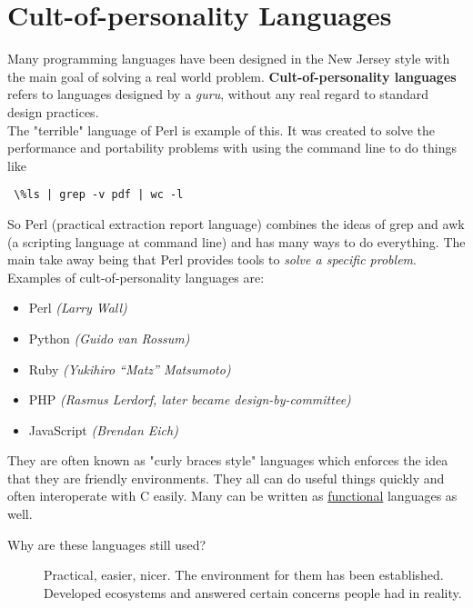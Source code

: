 \documentclass[twoside]{article}
\begin{document}
\section{Cult-of-personality Languages}
Many programming languages have been designed in the New Jersey style with the main goal of solving a real world problem. \textbf{Cult-of-personality languages}  refers to languages designed by a \emph{guru}, without any real regard to standard design practices.\\
 
\pagebreak
The "terrible" language of Perl is example of this. It was created to solve the performance and portability problems with using the command line to do things like \begin{verbatim} \%ls | grep -v pdf | wc -l \end{verbatim} So Perl (practical extraction report language) combines the ideas of grep and awk (a scripting language at command line) and has many ways to do everything. The main take away being that Perl provides tools to \emph{solve a specific problem}. Examples of cult-of-personality languages are:
\begin{itemize}
\item Perl \emph{(Larry Wall)}
\item Python \emph{(Guido van Rossum)}
\item Ruby \emph{(Yukihiro ``Matz'' Matsumoto)}
\item PHP \emph{(Rasmus Lerdorf, later became design-by-committee)}
\item JavaScript \emph{(Brendan Eich)}
\end{itemize}
They are often known as "curly braces style" languages which enforces the idea that they are friendly environments. They all can do useful things quickly and often interoperate with C easily. Many can be written as \underline{functional} languages as well. 
\begin{description}
\item[Why are these languages still used?] Practical, easier, nicer. The environment for them has been established. Developed ecosystems and answered certain concerns people had in reality. 
\end{description}
\end{document}
